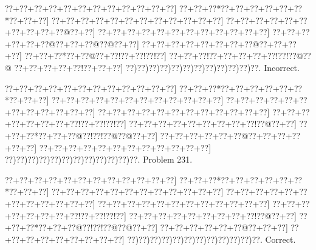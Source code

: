 \documentclass[a5paper]{article}
\begin{document}
\begin{center}
{\goo
\0??+\0??+\0??+\0??+\0??+\0??+\0??+\0??+\0??+\0??+\0??+\0??]
\0??+\0??+\0??*\0??+\0??+\0??+\0??+\0??+\0??*\0??+\0??+\0??]
\0??+\0??+\0??+\0??+\0??+\0??+\0??+\0??+\0??+\0??+\0??+\0??]
\0??+\0??+\0??+\0??+\0??+\0??+\0??+\0??+\0??+\0??@\0??+\0??]
\0??+\0??+\0??+\0??+\0??+\0??+\0??+\0??+\0??+\0??+\0??+\0??]
\0??+\0??+\0??+\0??+\0??+\0??@\0??+\0??+\0??@\0??@\0??+\0??]
\0??+\0??+\0??+\0??+\0??+\0??+\0??+\0??@\0??+\0??+\0??+\0??]
\0??+\0??+\0??*\0??+\0??@\0??+\0??!\0??+\0??!\0??!\0??]
\0??+\0??+\0??!\0??+\0??+\0??+\0??+\0??!\0??!\0??@\0??@
\0??+\0??+\0??+\0??+\0??!\0??+\0??+\0??]
\0??)\0??)\0??)\0??)\0??)\0??)\0??)\0??)\0??)\0??)\0??)\0??.
}
Incorrect. 

\end{center}
\newpage
\begin{center}
{\goo
\0??+\0??+\0??+\0??+\0??+\0??+\0??+\0??+\0??+\0??+\0??+\0??]
\0??+\0??+\0??*\0??+\0??+\0??+\0??+\0??+\0??*\0??+\0??+\0??]
\0??+\0??+\0??+\0??+\0??+\0??+\0??+\0??+\0??+\0??+\0??+\0??]
\0??+\0??+\0??+\0??+\0??+\0??+\0??+\0??+\0??+\0??+\0??+\0??]
\0??+\0??+\0??+\0??+\0??+\0??+\0??+\0??+\0??+\0??+\0??+\0??]
\0??+\0??+\0??+\0??+\0??+\0??+\0??+\0??!\0??+\0??!\0??!\0??]
\0??+\0??+\0??+\0??+\0??+\0??+\0??+\0??+\0??!\0??@\0??+\0??]
\0??+\0??+\0??*\0??+\0??+\0??@\0??!\0??!\0??@\0??@\0??+\0??]
\0??+\0??+\0??+\0??+\0??+\0??@\0??+\0??+\0??+\0??+\0??+\0??]
\0??+\0??+\0??+\0??+\0??+\0??+\0??+\0??+\0??+\0??+\0??+\0??]
\0??)\0??)\0??)\0??)\0??)\0??)\0??)\0??)\0??)\0??)\0??)\0??.
}
Problem 231.

\end{center}
\begin{center}
{\goo
\0??+\0??+\0??+\0??+\0??+\0??+\0??+\0??+\0??+\0??+\0??+\0??]
\0??+\0??+\0??*\0??+\0??+\0??+\0??+\0??+\0??*\0??+\0??+\0??]
\0??+\0??+\0??+\0??+\0??+\0??+\0??+\0??+\0??+\0??+\0??+\0??]
\0??+\0??+\0??+\0??+\0??+\0??+\0??+\0??+\0??+\0??+\0??+\0??]
\0??+\0??+\0??+\0??+\0??+\0??+\0??+\0??+\0??+\0??+\0??+\0??]
\0??+\0??+\0??+\0??+\0??+\0??+\0??+\0??!\0??+\0??!\0??!\0??]
\0??+\0??+\0??+\0??+\0??+\0??+\0??+\0??+\0??!\0??@\0??+\0??]
\0??+\0??+\0??*\0??+\0??+\0??@\0??!\0??!\0??@\0??@\0??+\0??]
\0??+\0??+\0??+\0??+\0??+\0??@\0??+\0??+\0??]
\0??+\0??+\0??+\0??+\0??+\0??+\0??+\0??+\0??]
\0??)\0??)\0??)\0??)\0??)\0??)\0??)\0??)\0??)\0??)\0??)\0??.
}
Correct. 

\end{center}
\end{document}
